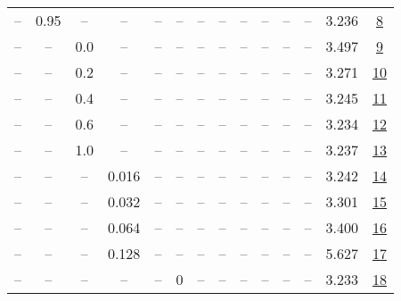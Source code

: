 \begin{table}[H]
\begin{tabular}{cccccccccccccc}
-- & 0.95 & -- & -- & -- & -- & -- & -- & -- & -- & -- & -- & 3.236 & \href{https://wandb.ai/stanford-mercury/optimizer-scaling/runs/sweep-300m-6B-sciondd97ff2lr0.008-wd0.1-minlr0-warmup0-b10.95-gn-16dc4b}{8} \\
-- & -- & 0.0 & -- & -- & -- & -- & -- & -- & -- & -- & -- & 3.497 & \href{https://wandb.ai/stanford-mercury/optimizer-scaling/runs/sweep-300m-6B-sciond7cb949lr0.008-wd0.1-minlr0-warmup0-b10.98-gn-78e5fe}{9} \\
-- & -- & 0.2 & -- & -- & -- & -- & -- & -- & -- & -- & -- & 3.271 & \href{https://wandb.ai/stanford-mercury/optimizer-scaling/runs/sweep-300m-6B-sciondf6ecb9lr0.008-wd0.1-minlr0-warmup0-b10.98-gn-cafe64}{10} \\
-- & -- & 0.4 & -- & -- & -- & -- & -- & -- & -- & -- & -- & 3.245 & \href{https://wandb.ai/stanford-mercury/optimizer-scaling/runs/sweep-300m-6B-sciond4823d5lr0.008-wd0.1-minlr0-warmup0-b10.98-gn-330e18}{11} \\
-- & -- & 0.6 & -- & -- & -- & -- & -- & -- & -- & -- & -- & 3.234 & \href{https://wandb.ai/stanford-mercury/optimizer-scaling/runs/sweep-300m-6B-sciond582086lr0.008-wd0.1-minlr0-warmup0-b10.98-gn-14e557}{12} \\
-- & -- & 1.0 & -- & -- & -- & -- & -- & -- & -- & -- & -- & 3.237 & \href{https://wandb.ai/stanford-mercury/optimizer-scaling/runs/sweep-300m-6B-sciondaa2504lr0.008-wd0.1-minlr0-warmup0-b10.98-gn-fbb75e}{13} \\
-- & -- & -- & 0.016 & -- & -- & -- & -- & -- & -- & -- & -- & 3.242 & \href{https://wandb.ai/stanford-mercury/optimizer-scaling/runs/sweep-300m-6B-sciond859faelr0.016-wd0.1-minlr0-warmup0-b10.98-gn-e582af}{14} \\
-- & -- & -- & 0.032 & -- & -- & -- & -- & -- & -- & -- & -- & 3.301 & \href{https://wandb.ai/stanford-mercury/optimizer-scaling/runs/sweep-300m-6B-sciond99bb86lr0.032-wd0.1-minlr0-warmup0-b10.98-gn-1251a1}{15} \\
-- & -- & -- & 0.064 & -- & -- & -- & -- & -- & -- & -- & -- & 3.400 & \href{https://wandb.ai/stanford-mercury/optimizer-scaling/runs/sweep-300m-6B-sciond92cc85lr0.064-wd0.1-minlr0-warmup0-b10.98-gn-c0733d}{16} \\
-- & -- & -- & 0.128 & -- & -- & -- & -- & -- & -- & -- & -- & 5.627 & \href{https://wandb.ai/stanford-mercury/optimizer-scaling/runs/sweep-300m-6B-sciond02a6a1lr0.128-wd0.1-minlr0-warmup0-b10.98-gn-465361}{17} \\
-- & -- & -- & -- & -- & 0 & -- & -- & -- & -- & -- & -- & 3.233 & \href{https://wandb.ai/stanford-mercury/optimizer-scaling/runs/sweep-300m-6B-sciond8e7d0flr0.008-wd0.1-minlr0-warmup0-b10.98-gn-35a8c6}{18} \\

\end{tabular}
\end{table}
